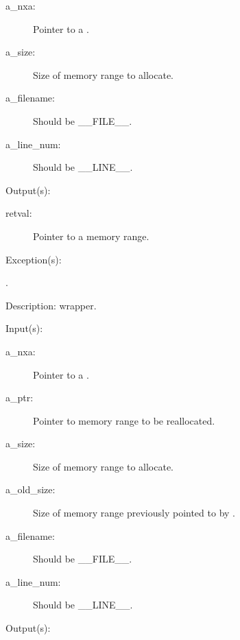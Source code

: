 \begin{capi}
\begin{capilist}
\begin{description}
		\item[a\_nxa: ]
			Pointer to a .
		\item[a\_size: ]
			Size of memory range to allocate.
		\item[a\_filename: ]
			Should be \_\_FILE\_\_.
		\item[a\_line\_num: ]
			Should be \_\_LINE\_\_.
		\end{description}
	\item[Output(s): ]
		\begin{description}\item[]
		\item[retval: ]
			Pointer to a memory range.
		\end{description}
	\item[Exception(s): ]
		\begin{description}\item[]
		\item[.]
		\end{description}
	\item[Description: ]
		 wrapper.
	\end{capilist}
\label{nxa_realloc_e}
\label{nxa_realloc}
	\begin{capilist}
	\item[Input(s): ]
		\begin{description}\item[]
		\item[a\_nxa: ]
			Pointer to a .
		\item[a\_ptr: ]
			Pointer to memory range to be reallocated.
		\item[a\_size: ]
			Size of memory range to allocate.
		\item[a\_old\_size: ]
			Size of memory range previously pointed to by
			.
		\item[a\_filename: ]
			Should be \_\_FILE\_\_.
		\item[a\_line\_num: ]
			Should be \_\_LINE\_\_.
		\end{description}
	\item[Output(s): ]
		\begin{description}\item[]

\end{description}
\end{capilist}
\end{capi}

